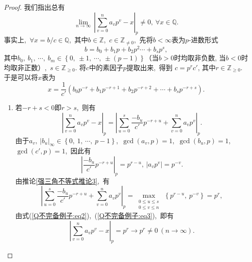 \documentclass[UTF8, twoside]{ctexart}
\theoremstyle{nonumberplain}
\newtheorem{proof}{\heiti 证明}  %
\theoremstyle{nonumberplain}
\theoremstyle{plain}
\begin{document}
	\begin{proof}
		我们指出总有
		\begin{equation} \label{Q不完备例子:eq1}
			\underset{n\to \infty }{\mathop{\lim }}\,{{\left| \sum\limits_{v=0}^{n}{{{a}_{v}}{{p}^{v}}}-x \right|}_{p}}\ne 0,\ \forall x\in \mathbb{Q}. 
		\end{equation}
		事实上,\ $\forall x={b}/{c}\in \mathbb{Q}$,\ 其中$b\in \mathbb{Z}$,\ $c\in {{\mathbb{Z}}_{\ne 0}}$,\ 先将$b<\infty $表为$p$-进数形式
		\[
			b={{b}_{0}}+{{b}_{1}}p+{{b}_{2}}{{p}^{2}}\cdots +{{b}_{s}}{{p}^{s}},
		\]
		其中${{b}_{0}},\ {{b}_{1}},\ \cdots,\ {{b}_{m}}\in \left\{ 0,\ \pm 1,\ \cdots,\ \pm \left( p-1 \right) \right\}$（当$b>0$时均取非负数, 当$b<0$时均取非正数）,\ $s\in {{\mathbb{Z}}_{\ge 0}}$. 将$c$中的素因子$p$提取出来,\ 得到
		$
			c={{p}^{r}}c'
		$,
		其中$r\in {{\mathbb{Z}}_{\ge 0}}$. 于是可以将$x$表为
		\[
			x=\frac{1}{c'}\left( {{b}_{0}}{{p}^{-r}}+{{b}_{1}}{{p}^{-r+1}}+{{b}_{2}}{{p}^{-r+2}}+\cdots +{{b}_{s}}{{p}^{-r+s}} \right).
		\]
		\vskip 0.3cm
		\begin{enumerate}
			\item 若$-r+s<0$即$r>s$,\ 则有
			\begin{equation}  \label{Q不完备例子:eq2}
				{{\left| \sum\limits_{v=0}^{n}{{{a}_{v}}{{p}^{v}}}-x \right|}_{p}}={{\left| \sum\limits_{u=0}^{s}{\frac{-{{b}_{u}}}{c'}{{p}^{-r+u}}}+\sum\limits_{v=0}^{n}{{{a}_{v}}{{p}^{v}}} \right|}_{p}}.
			\end{equation}
			由于${{a}_{v}},\ {{\left| {{b}_{u}} \right|}_{\infty }}\in \left\{ 0,\ 1,\ \cdots,\ p-1 \right\}$,\ $\gcd \left( {{a}_{v}},p \right)=1$,\ $\gcd \left( {{b}_{u}},p \right)=1$,\ $\gcd \left( c',p \right)=1$,\ 因此有
			\[
				{{\left| \frac{-{{b}_{u}}}{c'}{{p}^{-r+u}} \right|}_{p}}={{p}^{r-u}},\ \left| {{a}_{v}}{{p}^{v}} \right|={{p}^{-v}}.
			\]
			由推论\ref{强三角不等式推论3},\ 有
			\begin{equation}  \label{Q不完备例子:eq3}
				{{\left| \sum\limits_{u=0}^{s}{\frac{-{{b}_{u}}}{c'}{{p}^{-r+u}}}+\sum\limits_{v=0}^{n}{{{a}_{v}}{{p}^{v}}} \right|}_{p}}=\underset{
					\begin{smallmatrix} 
						0\le u\le s \\ 
						0\le v\le n 
					\end{smallmatrix}}{\mathop{\max }}\,\left\{ {{p}^{r-u}},\ {{p}^{-v}} \right\}={{p}^{r}},
			\end{equation}
			由式(\ref{Q不完备例子:eq2}),\ (\ref{Q不完备例子:eq3}),\ 即有
			\begin{equation}  \label{Q不完备例子:eq4}
				{{\left| \sum\limits_{v=0}^{n}{{{a}_{v}}{{p}^{v}}-x} \right|}_{p}}={{p}^{r}}\to {{p}^{r}}\ne 0
				\ \left( n\to \infty  \right).
			\end{equation}
			\vskip 0.3cm
			

\end{enumerate}
\end{proof}
\end{document}
